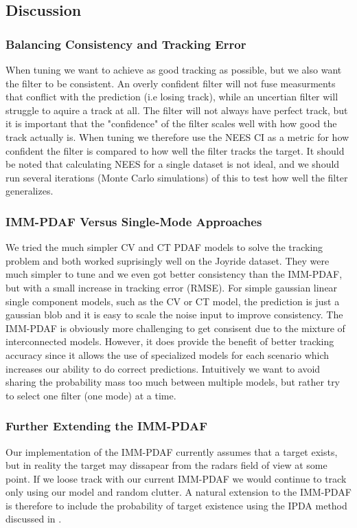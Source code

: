 \subsection{Discussion}
\subsubsection{Balancing Consistency and Tracking Error}
When tuning we want to achieve as good tracking as possible, but we also want the filter to be consistent. An overly confident filter will not fuse measurments that conflict with the prediction (i.e losing track), while an uncertian filter will struggle to aquire a track at all. The filter will not always have perfect track, but it is important that the "confidence" of the filter scales well with how good the track actually is.
When tuning we therefore use the NEES CI as a metric for how confident the filter is compared to how well the filter tracks the target. It should be noted that calculating NEES for a single dataset is not ideal, and we should run several iterations (Monte Carlo simulations) of this to test how well the filter generalizes.

\subsubsection{IMM-PDAF Versus Single-Mode Approaches} \label{whyimmpdaf}
We tried the much simpler CV and CT PDAF models to solve the tracking problem and both worked suprisingly well on the Joyride dataset. They were much simpler to tune and we even got better consistency than the IMM-PDAF, but with a small increase in tracking error (RMSE). For simple gaussian linear single component models, such as the CV or CT model, the prediction is just a gaussian blob and it is easy to scale the noise input to improve consistency. The IMM-PDAF is obviously more challenging to get consisent due to the mixture of interconnected models. However, it does provide the benefit of better tracking accuracy since it allows the use of specialized models for each scenario which increases our ability to do correct predictions. Intuitively we want to avoid sharing the probability mass too much between multiple models, but rather try to select one filter (one mode) at a time.

\subsubsection{Further Extending the IMM-PDAF}
Our implementation of the IMM-PDAF currently assumes that a target exists, but in reality the target may dissapear from the radars field of view at some point. If we loose track with our current IMM-PDAF we would continue to track only using our model and random clutter. A natural extension to the IMM-PDAF is therefore to include the probability of target existence using the IPDA method discussed in \cite{imm-ipda}.
